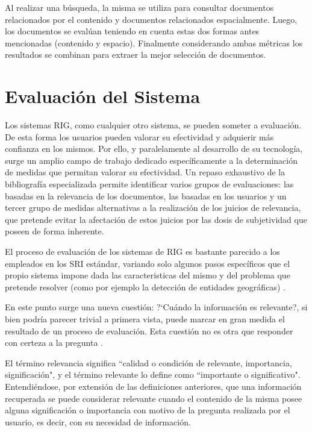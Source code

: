 \documentclass{llncs}
\begin{document}
Al realizar una búsqueda, la misma se utiliza para consultar documentos
relacionados por el contenido y documentos relacionados espacialmente. Luego,
los documentos se evalúan teniendo en cuenta estas dos formas antes mencionadas
(contenido y espacio). Finalmente considerando ambas métricas los
resultados se combinan para extraer la mejor selección de documentos.

\section{Evaluación del Sistema}\label{sec:eval}

Los sistemas RIG, como cualquier otro sistema, se pueden someter a evaluación.
De esta forma los usuarios pueden valorar su efectividad y adquierir más confianza
en los mismos. Por ello, y paralelamente al desarrollo de su tecnología, surge un
amplio campo de trabajo dedicado específicamente a la determinación de medidas
que permitan valorar su efectividad. Un repaso exhaustivo de la bibliografía
especializada permite identificar varios grupos de evaluaciones: las basadas en
la relevancia de los documentos, las basadas en los usuarios y un tercer grupo
de medidas alternativas a la realización de los juicios de relevancia, que
pretende evitar la afectación de estos juicios por las dosis de subjetividad que
poseen de forma inherente.

El proceso de evaluación de los sistemas de RIG es bastante parecido a los
empleados en los SRI estándar, variando solo algunos pasos específicos que el
propio sistema impone dada las caracteristicas del mismo y del problema que
pretende resolver (como por ejemplo la detección de entidades geográficas)
\cite{Kornai2005}.

En este punto surge una nueva cuestión: ?`Cuándo la información es
relevante?, si bien podría parecer trivial a primera vista, puede marcar en
gran medida el resultado de un proceso de evaluación. Esta cuestión no es otra
que responder con certeza a la pregunta .

El término relevancia significa ``calidad o condición de relevante,
importancia, significación", y el término relevante lo define como
``importante o significativo". Entendiéndose, por extensión de las definiciones
anteriores, que una información recuperada se puede considerar relevante
cuando el contenido de la misma posee alguna significación o importancia
con motivo de la pregunta realizada por el usuario, es decir, con su
necesidad de información.
\end{document}

